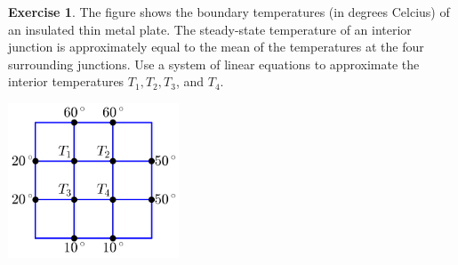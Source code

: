 \documentclass[handout]{beamer}
\theoremstyle{definition}
\newtheorem{exercise}{Exercise}
\begin{document}
\begin{frame}{\insertframenumber}
	\begin{exercise}
		The figure shows the boundary temperatures (in degrees Celcius) of an insulated thin metal plate.  The steady-state temperature of an interior junction is approximately equal to the mean of the temperatures at the four surrounding junctions.  Use a system of linear equations to approximate the interior temperatures $T_1,T_2,T_3$, and $T_4$.
	\begin{center}
		\includegraphics[width=2in]{images/temp_grid}
	\end{center}
	\end{exercise}
\end{frame}
\end{document}
